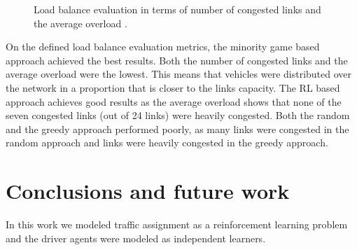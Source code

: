 \documentclass{RITA}
\begin{document}
\begin{figure}[ht]
  \centering
  \caption{Load balance evaluation in terms of number of congested links  and the average overload .}
  \label{fig:loadBalance}
\end{figure}

On the defined load balance evaluation metrics, the minority game based approach achieved the best results. Both the number of congested links and the average overload were the lowest. This means that vehicles were distributed over the network in a proportion that is closer to the links capacity. The RL based approach achieves good results as the average overload shows that none of the seven congested links (out of 24 links) were heavily congested. Both the random and the greedy approach performed poorly, as many links were congested in the random approach and links were heavily congested in the greedy approach.

\section{Conclusions and future work}
\label{sec:conclusions}

In this work we modeled traffic assignment as a reinforcement learning problem and the driver agents were modeled as independent learners.
\end{document}
